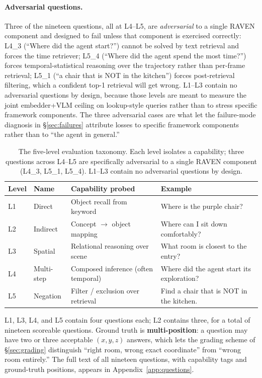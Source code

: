 \documentclass[12pt,letterpaper,oneside]{article}
\begin{document}
\paragraph{Adversarial questions.}
Three of the nineteen questions, all at L4--L5, are
\emph{adversarial} to a single RAVEN component and designed to fail
unless that component is exercised correctly: L4\_3 (``Where did the
agent start?'') cannot be solved by text retrieval and forces the
time retriever; L5\_4 (``Where did the agent spend the most time?'')
forces temporal-statistical reasoning over the trajectory rather than
per-frame retrieval; L5\_1 (``a chair that is NOT in the kitchen'')
forces post-retrieval filtering, which a confident top-1 retrieval
will get wrong. L1--L3 contain no adversarial questions by design,
because those levels are meant to measure the joint
embedder+VLM ceiling on lookup-style queries rather than to stress
specific framework components.  The three adversarial cases are what
let the failure-mode diagnosis in \S\ref{sec:failures} attribute
losses to specific framework components rather than to ``the agent
in general.''

\begin{table}[ht]
  \centering
  \caption{The five-level evaluation taxonomy. Each level isolates a
    capability; three questions across L4--L5 are specifically
    adversarial to a single RAVEN component (L4\_3, L5\_1, L5\_4).
    L1--L3 contain no adversarial questions by design.}
  \label{tab:levels}
  \small
  \begin{tabularx}{\textwidth}{@{}llXX@{}}
    \toprule
    Level & Name & Capability probed & Example \\
    \midrule
    L1 & Direct & Object recall from keyword & Where is the purple chair? \\
    L2 & Indirect & Concept $\to$ object mapping & Where can I sit down comfortably? \\
    L3 & Spatial & Relational reasoning over scene & What room is closest to the entry? \\
    L4 & Multi-step & Composed inference (often temporal) & Where did the agent start its exploration? \\
    L5 & Negation & Filter / exclusion over retrieval & Find a chair that is NOT in the kitchen. \\
    \bottomrule
  \end{tabularx}
\end{table}

L1, L3, L4, and L5 contain four questions each; L2 contains three,
for a total of nineteen scoreable questions.  Ground truth is
\textbf{multi-position}: a question may have two or three acceptable
$(x, y, z)$ answers, which lets the grading scheme of
\S\ref{sec:grading} distinguish ``right room, wrong exact coordinate''
from ``wrong room entirely.''
The full text of all nineteen questions, with capability tags and
ground-truth positions, appears in Appendix~\ref{app:questions}.
\end{document}
